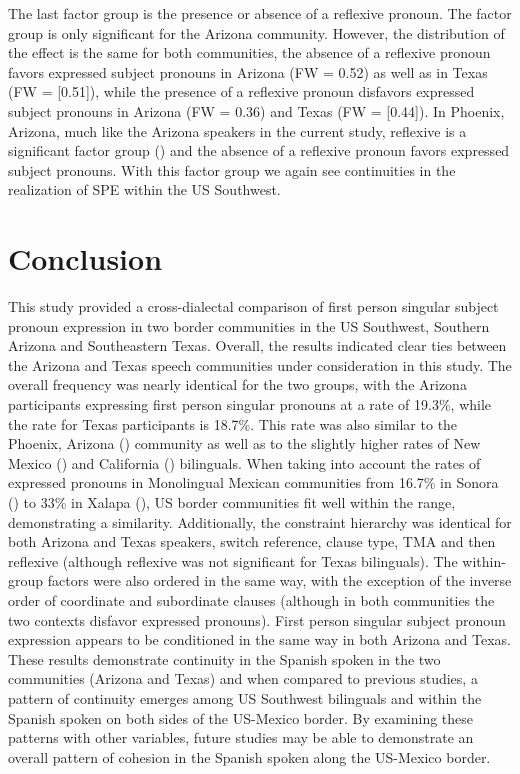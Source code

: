 \documentclass[output=paper]{langscibook}
\begin{document}
The last factor group is the presence or absence of a reflexive pronoun. The factor group is only significant for the Arizona community. However, the distribution of the effect is the same for both communities, the absence of a reflexive pronoun favors expressed subject pronouns in Arizona (FW = 0.52) as well as in Texas (FW = [0.51]), while the presence of a reflexive pronoun disfavors expressed subject pronouns in Arizona (FW = 0.36) and Texas (FW = [0.44]). In Phoenix, Arizona, much like the Arizona speakers in the current study, reflexive is a significant factor group (\citealt{Cerrón-Palomino2016}) and the absence of a reflexive pronoun favors expressed subject pronouns. With this factor group we again see continuities in the realization of SPE within the US Southwest.



\section{Conclusion}



This study provided a cross-dialectal comparison of first person singular subject pronoun expression in two border communities in the US Southwest, Southern Arizona and Southeastern Texas. Overall, the results indicated clear ties between the Arizona and Texas speech communities under consideration in this study. The overall frequency was nearly identical for the two groups, with the Arizona participants expressing first person singular pronouns at a rate of 19.3\%, while the rate for Texas participants is 18.7\%. This rate was also similar to the Phoenix, Arizona (\citealt{Cerrón-Palomino2016}) community as well as to the slightly higher rates of New Mexico (\citealt{TorresCacoullosTravis2010b}) and California (\citealt{Silva-Corvalán1994}) bilinguals. When taking into account the rates of expressed pronouns in Monolingual Mexican communities from 16.7\% in Sonora (\citealt{Bessett2018}) to 33\% in Xalapa (\citealt{Orozco2016}), US border communities fit well within the range, demonstrating a similarity. Additionally, the constraint hierarchy was identical for both Arizona and Texas speakers, switch reference, clause type, TMA and then reflexive (although reflexive was not significant for Texas bilinguals). The within-group factors were also ordered in the same way, with the exception of the inverse order of coordinate and subordinate clauses (although in both communities the two contexts disfavor expressed pronouns). First person singular subject pronoun expression appears to be conditioned in the same way in both Arizona and Texas. These results demonstrate continuity in the Spanish spoken in the two communities (Arizona and Texas) and when compared to previous studies, a pattern of continuity emerges among US Southwest bilinguals and within the Spanish spoken on both sides of the US-Mexico border. By examining these patterns with other variables, future studies may be able to demonstrate an overall pattern of cohesion in the Spanish spoken along the US-Mexico border.


\printbibliography[heading=subbibliography]
\end{document}
